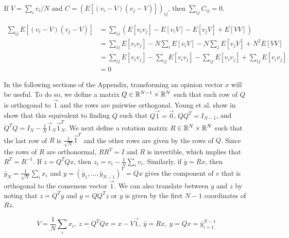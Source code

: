 \documentclass{article}
\begin{document}
\begin{fact}
If $V=\sum_iv_i/N$ and $C=\left(E[(v_i-V)(v_j-V)]\right)_{ij}$, then $\sum_{ij}C_{ij}=0$.
\end{fact}
\begin{pf}
\begin{align*}
\sum_{ij}E[(v_i-V)(v_j-V)]&=\sum_{ij}\left(E[v_iv_j]-E[v_iV]-E[v_jV]+E[VV]\right)
\\&=\sum_{ij}E[v_iv_j]-N\sum_iE[v_iV]-N\sum_jE[v_jV]+N^2E[VV]
\\&=\sum_{ij}E[v_iv_j]-\sum_{ij}E[v_iv_j]-\sum_{ij}E[v_iv_j]+\sum_{ij}E[v_iv_j]
\\&=0
\end{align*}
\end{pf}

In the following sections of the Appendix, transforming an opinion vector $x$ will be useful.  To do so, we define a matrix $Q\in{\mathbb{R}}^{N-1}\times{\mathbb{R}}^N$ such that each row of $Q$ is orthogonal to $\vec{1}$ and the rows are pairwise orthogonal. Young et al. show in \cite{Young:2010fk} show that this equivalent to finding $Q$ such that $Q\vec{1}=\vec{0}$, $QQ^T=I_{N-1}$, and $Q^TQ=I_N-\frac{1}{N}\vec{1}_N\vec{1}_N^T$.  We next define a rotation matrix $R\in{\mathbb{R}}^N\times{\mathbb{R}}^N$ such that the last row of $R$ is $\frac{1}{\sqrt{N}}\vec{1}^T$ and the other rows are given by the rows of $Q$. Since the rows of $R$ are orthonormal, $RR^T=I$ and $R$ is invertible, which implies that $R^T=R^{-1}$. If $z=Q^TQx$, then $z_i=v_i-\frac{1}{N}\sum_iv_i$. Similarly, if $\bar{y}=Rx$, then $\bar{y}_N=\frac{1}{\sqrt{N}}\sum_ix_i$ and $y=(\bar{y}_1,\dots,\bar{y}_{N-1})^T=Qx$ gives the component of $v$ that is orthogonal to the consensus vector $\vec{1}$. We can also translate between $y$ and $z$ by noting that $z=Q^Ty$ and $y=QQ^Tz$ or $y$ is given by the first $N-1$ coordinates of $Rz$.

\begin{equation} \label{transformations}
 \boxed{V=\frac{1}{N}\sum_ix_i ,\ z=Q^TQx=x-V\vec{1}, \ \bar{y}=Rx,\ y=Qx=\bar{y}_{i=1}^{N-1}}
 \end{equation}
 
\end{document}
